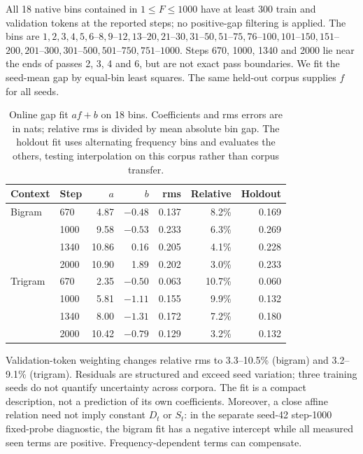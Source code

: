All 18 native bins contained in $1\le F\le1000$ have at least 300 train and validation tokens at the reported steps; no positive-gap filtering is applied. The bins are $1,2,3,4,5,6$--$8,9$--$12,13$--$20,21$--$30,31$--$50,51$--$75,76$--$100,101$--$150,151$--$200,201$--$300,301$--$500,501$--$750,751$--$1000$. Steps 670, 1000, 1340 and 2000 lie near the ends of passes 2, 3, 4 and 6, but are not exact pass boundaries. We fit the seed-mean gap by equal-bin least squares. The same held-out corpus supplies $f$ for all seeds.

\begin{table}[!htbp]
\centering\small
\caption{Online gap fit $af+b$ on 18 bins. Coefficients and rms errors are in nats; relative rms is divided by mean absolute bin gap. The holdout fit uses alternating frequency bins and evaluates the others, testing interpolation on this corpus rather than corpus transfer.}
\label{tab:affine}
\begin{tabular}{llrrrrr}
\toprule
Context & Step & $a$ & $b$ & rms & Relative & Holdout\\
\midrule
Bigram & 670 & 4.87 & $-0.48$ & 0.137 & 8.2\% & 0.169\\
 & 1000 & 9.58 & $-0.53$ & 0.233 & 6.3\% & 0.269\\
 & 1340 & 10.86 & 0.16 & 0.205 & 4.1\% & 0.228\\
 & 2000 & 10.90 & 1.89 & 0.202 & 3.0\% & 0.233\\
Trigram & 670 & 2.35 & $-0.50$ & 0.063 & 10.7\% & 0.060\\
 & 1000 & 5.81 & $-1.11$ & 0.155 & 9.9\% & 0.132\\
 & 1340 & 8.00 & $-1.31$ & 0.172 & 7.2\% & 0.180\\
 & 2000 & 10.42 & $-0.79$ & 0.129 & 3.2\% & 0.132\\
\bottomrule
\end{tabular}
\end{table}

Validation-token weighting changes relative rms to 3.3--10.5\% (bigram) and 3.2--9.1\% (trigram). Residuals are structured and exceed seed variation; three training seeds do not quantify uncertainty across corpora. The fit is a compact description, not a prediction of its own coefficients. Moreover, a close affine relation need not imply constant $D_t$ or $S_t$: in the separate seed-42 step-1000 fixed-probe diagnostic, the bigram fit has a negative intercept while all measured seen terms are positive. Frequency-dependent terms can compensate.

